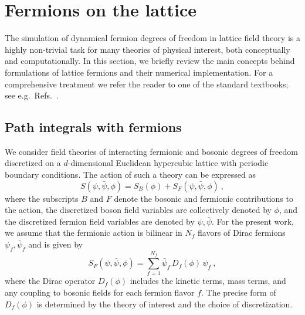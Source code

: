 \documentclass[aps,prd,twocolumn,nofootinbib,superscriptaddress,preprintnumbers]{revtex4-1}
\begin{document}
\section{Fermions on the lattice}
\label{sec:theory}

The simulation of dynamical fermion degrees of freedom in lattice field theory is a highly non-trivial task for many theories of physical interest, both conceptually and computationally. In this section, we briefly review the main concepts behind formulations of lattice fermions and their numerical implementation. For a comprehensive treatment we refer the reader to one of the standard textbooks; see e.g.~Refs.~\cite{Gattringer:2010zz,Montvay:1994cy,Rothe:1992nt}.


\subsection{Path integrals with fermions}

We consider field theories of interacting fermionic and bosonic degrees of freedom discretized on a $d$-dimensional Euclidean hypercubic lattice with periodic boundary conditions. The action of such a theory can be expressed as
%
\begin{equation}\label{eq:fermionic-theory-action}
    S(\psi,\bar{\psi},\phi) = S_B(\phi) + S_F(\psi,\bar{\psi},\phi)\ ,
\end{equation}
%
where the subscripts $B$ and $F$ denote the bosonic and fermionic contributions to the action, the discretized boson field variables are collectively denoted by $\phi$, and the discretized fermion field variables are denoted by $\psi,\bar{\psi}$. For the present work, we assume that the fermionic action is bilinear in $N_f$ flavors of Dirac fermions $\psi_f,\bar{\psi}_f$ and is given by
%
\begin{equation}\label{eq:fermion-action}
    S_F(\psi,\bar{\psi},\phi) = \sum_{f=1}^{N_f} \bar{\psi}_f \, D_f(\phi)\, \psi_f \ ,
\end{equation}
%
where the Dirac operator $D_f(\phi)$ includes the kinetic terms, mass terms, and any coupling to bosonic fields for each fermion flavor $f$. The precise form of $D_f(\phi)$ is determined by the theory of interest and the choice of discretization.
\end{document}
